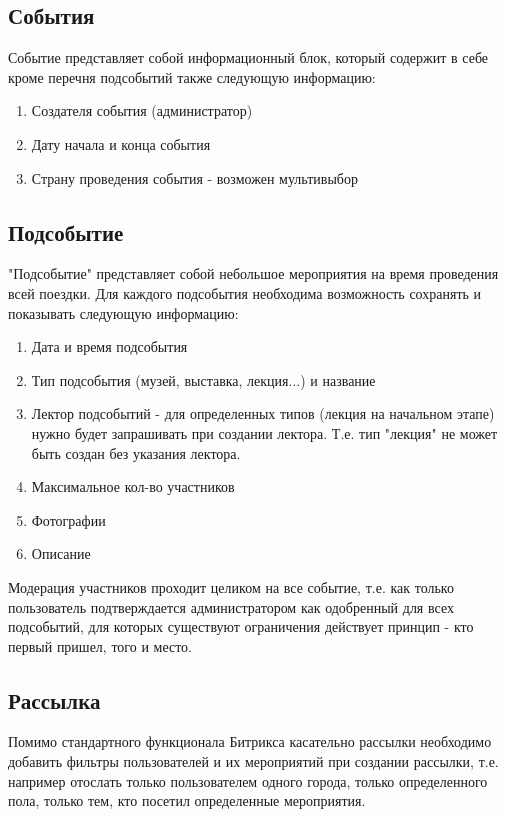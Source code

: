 \documentclass[DIV=calc, paper=a4, fontsize=11pt]{scrartcl} %
\begin{document}
\subsection{События}
Событие представляет собой информационный блок, который содержит в себе кроме перечня подсобытий также следующую информацию:

    \begin{enumerate}
        \item Создателя события (администратор) 
        \item Дату начала и конца события
        \item Страну проведения события - возможен мультивыбор 
    \end{enumerate}
    
\subsection{Подсобытие}
"Подсобытие" представляет собой небольшое мероприятия на время проведения всей поездки. Для каждого подсобытия необходима возможность сохранять и показывать следующую информацию:


    \begin{enumerate}
        \item Дата и время подсобытия
        \item Тип подсобытия (музей, выставка, лекция...) и название
        \item Лектор подсобытий - для определенных типов (лекция на начальном этапе) нужно будет запрашивать при создании лектора. Т.е. тип "лекция" не может быть создан без указания лектора.
        \item Максимальное кол-во участников
        \item Фотографии
        \item Описание
    \end{enumerate}
Модерация участников проходит целиком на все событие, т.е. как только пользователь подтверждается администратором как одобренный для всех подсобытий, для которых существуют ограничения действует принцип - кто первый пришел, того и место.

\subsection{Рассылка}
Помимо стандартного функционала Битрикса касательно рассылки необходимо добавить фильтры пользователей и их мероприятий при создании рассылки, т.е. например отослать только пользователем одного города, только определенного пола, только тем, кто посетил определенные мероприятия.
\end{document}
